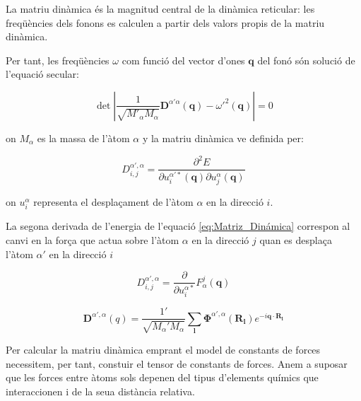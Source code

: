 \documentclass[12pt]{article} %
\let\vec\mathbf %
\begin{document}
{La matriu dinàmica és la magnitud central de la dinàmica reticular: les freqüències dels fonons es calculen a partir dels valors propis de la matriu dinàmica.

Per tant, les freqüències $\omega$ com funció del vector d'ones $\vec q$ del fonó són solució de l'equació secular:

\begin{equation}
\label{eq:secular}
\det\left|\frac{1}{\sqrt{M'_\alpha M_{\alpha}}}\vec D^{\alpha'\alpha}\left(\vec q\right)-{\omega'}^2\left(\vec q\right)\right|=0 
\end{equation}

on $M_{\alpha}$ es la massa de l'àtom $\alpha$ y la matriu dinàmica ve definida per:

\begin{equation}
D^{\alpha',\alpha}_{i,j}=\frac{\partial^2 E}{\partial u^{\alpha'*}_i(\vec q)\partial u^{\alpha}_{j}(\vec q)}
\label{eq:Matriz_Dinámica}
\end{equation}

on $u^{\alpha}_{i}$ representa el despla\c{c}ament de l'àtom $\alpha$ en la direcció $i$.

La segona derivada de l'energia de l'equació \ref{eq:Matriz_Dinámica} correspon al canvi en la for\c{c}a que actua sobre l'àtom $\alpha$ en la direcció $j$ quan es despla\c{c}a l'àtom $\alpha'$ en la direcció $i$

\begin{equation}
D^{\alpha',\alpha}_{i,j}=\frac{\partial}{\partial u^{\alpha*}_{i}}F^{j}_{\alpha}(\vec q)
\end{equation}


\begin{equation}
 \label{eq:matriu_dinàmica}
 \boxed{
 \vec D^{\alpha',\alpha}(q)=\frac{1'}{\sqrt{M_\alpha' M_{\alpha}}}\sum_\vec l\vec\Phi^{\alpha',\alpha}\left(\vec R_\vec l\right)e^{-i\vec q\cdot\vec R_\vec l}}
\end{equation}




Per calcular la matriu dinàmica emprant el model de constants de forces necessitem, per tant, constuir el tensor de constants de forces. Anem a suposar que les forces entre àtoms sols depenen del tipus d'elements químics que interaccionen i de la seua distància relativa.

}
\end{document}
